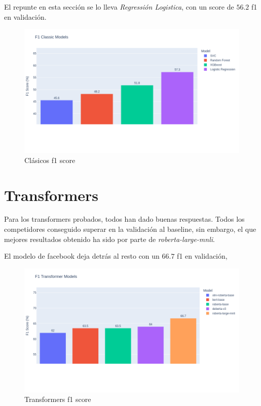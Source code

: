 \documentclass[11pt,spanish,listoffigures,listoftables]{tfgetsinf}
\begin{document}
El repunte en esta sección se lo lleva \textit{Regressión Logistica}, con un score de $56.2$ f1 en validación.
\begin{figure}[H]
    \centering
    \includegraphics[width=1.0\linewidth]{images/F1-classic.png}
    \caption{Clásicos f1 score}
    \label{fig:Clasicos-f1-sore}
\end{figure}


\section{Transformers}
Para los transformers probados, todos han dado buenas respuestas. Todos los competidores conseguido superar en la validación al baseline, sin embargo, el que mejores resultados obtenido ha sido por parte de \textit{roberta-large-mnli}. 

El modelo de facebook deja detrás al resto con un $66.7$ f1 en validación,

\begin{figure}[H]
    \centering
    \includegraphics[width=1.0\linewidth]{images/F1-transformers.png}
    \caption{Transformers f1 score}
    \label{fig:Tranformers-f1-score}
\end{figure}
\end{document}
